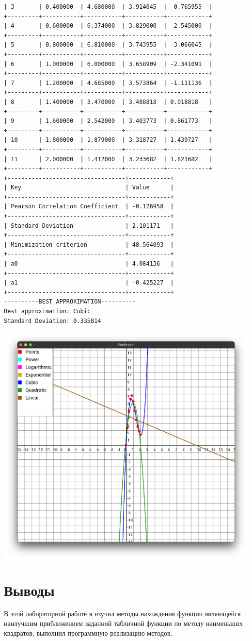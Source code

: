 \documentclass[12pt,one column]{article}
\begin{document}
\begin{verbatim}
| 3       | 0.400000  | 4.680000  | 3.914045  | -0.765955  | 
+---------+-----------+-----------+-----------+------------+
| 4       | 0.600000  | 6.374000  | 3.829000  | -2.545000  | 
+---------+-----------+-----------+-----------+------------+
| 5       | 0.800000  | 6.810000  | 3.743955  | -3.066045  | 
+---------+-----------+-----------+-----------+------------+
| 6       | 1.000000  | 6.000000  | 3.658909  | -2.341091  | 
+---------+-----------+-----------+-----------+------------+
| 7       | 1.200000  | 4.685000  | 3.573864  | -1.111136  | 
+---------+-----------+-----------+-----------+------------+
| 8       | 1.400000  | 3.470000  | 3.488818  | 0.018818   | 
+---------+-----------+-----------+-----------+------------+
| 9       | 1.600000  | 2.542000  | 3.403773  | 0.861773   | 
+---------+-----------+-----------+-----------+------------+
| 10      | 1.800000  | 1.879000  | 3.318727  | 1.439727   | 
+---------+-----------+-----------+-----------+------------+
| 11      | 2.000000  | 1.412000  | 3.233682  | 1.821682   | 
+---------+-----------+-----------+-----------+------------+
+----------------------------------+------------+
| Key                              | Value      | 
+----------------------------------+------------+
| Pearson Correlation Coefficient  | -0.126958  | 
+----------------------------------+------------+
| Standard Deviation               | 2.101171   | 
+----------------------------------+------------+
| Minimization criterion           | 48.564093  | 
+----------------------------------+------------+
| a0                               | 4.084136   | 
+----------------------------------+------------+
| a1                               | -0.425227  | 
+----------------------------------+------------+
----------BEST APPROXIMATION----------
Best approximation: Cubic
Standard Deviation: 0.335814
\end{verbatim}
\includegraphics[width = \textwidth]{img3.png}

\section{Выводы}
В этой лабораторной работе я изучил методы нахождения функции являющейся наилучшим приближением заданной табличной функции по методу наименьших квадратов, выполнил программную реализацию методов. 
\end{document}
